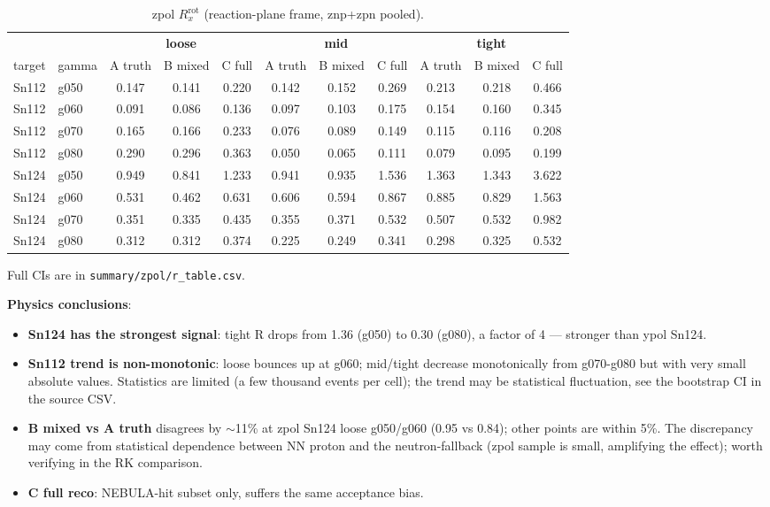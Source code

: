 \documentclass[a4paper,11pt]{article}
\begin{document}
\begin{table}[H]
\centering\scriptsize
\caption{zpol $R_x^\text{rot}$ (reaction-plane frame, znp+zpn pooled).}
\begin{tabular}{ll|ccc|ccc|ccc}
\toprule
& & \multicolumn{3}{c|}{\textbf{loose}} & \multicolumn{3}{c|}{\textbf{mid}} & \multicolumn{3}{c}{\textbf{tight}} \\
target & gamma & A truth & B mixed & C full & A truth & B mixed & C full & A truth & B mixed & C full \\
\midrule
Sn112 & g050 & 0.147 & 0.141 & 0.220 & 0.142 & 0.152 & 0.269 & 0.213 & 0.218 & 0.466 \\
Sn112 & g060 & 0.091 & 0.086 & 0.136 & 0.097 & 0.103 & 0.175 & 0.154 & 0.160 & 0.345 \\
Sn112 & g070 & 0.165 & 0.166 & 0.233 & 0.076 & 0.089 & 0.149 & 0.115 & 0.116 & 0.208 \\
Sn112 & g080 & 0.290 & 0.296 & 0.363 & 0.050 & 0.065 & 0.111 & 0.079 & 0.095 & 0.199 \\
Sn124 & g050 & 0.949 & 0.841 & 1.233 & 0.941 & 0.935 & 1.536 & 1.363 & 1.343 & 3.622 \\
Sn124 & g060 & 0.531 & 0.462 & 0.631 & 0.606 & 0.594 & 0.867 & 0.885 & 0.829 & 1.563 \\
Sn124 & g070 & 0.351 & 0.335 & 0.435 & 0.355 & 0.371 & 0.532 & 0.507 & 0.532 & 0.982 \\
Sn124 & g080 & 0.312 & 0.312 & 0.374 & 0.225 & 0.249 & 0.341 & 0.298 & 0.325 & 0.532 \\
\bottomrule
\end{tabular}
\end{table}

Full CIs are in \texttt{summary/zpol/r\_table.csv}.

\textbf{Physics conclusions}:
\begin{itemize}[nosep]
    \item \textbf{Sn124 has the strongest signal}: tight R drops from 1.36 (g050) to 0.30 (g080), a factor of 4 --- stronger than ypol Sn124.
    \item \textbf{Sn112 trend is non-monotonic}: loose bounces up at g060; mid/tight decrease monotonically from g070-g080 but with very small absolute values. Statistics are limited (a few thousand events per cell); the trend may be statistical fluctuation, see the bootstrap CI in the source CSV.
    \item \textbf{B mixed vs A truth} disagrees by $\sim$11\% at zpol Sn124 loose g050/g060 (0.95 vs 0.84); other points are within 5\%. The discrepancy may come from statistical dependence between NN proton and the neutron-fallback (zpol sample is small, amplifying the effect); worth verifying in the RK comparison.
    \item \textbf{C full reco}: NEBULA-hit subset only, suffers the same acceptance bias.
\end{itemize}
\end{document}
